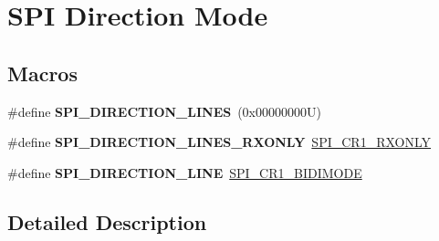 \hypertarget{group___s_p_i___direction}{}\section{S\+PI Direction Mode}
\label{group___s_p_i___direction}
\subsection*{Macros}
\begin{DoxyCompactItemize}
\item 
\mbox{\label{group___s_p_i___direction_gaa7cb7f4bf4eebbf91bcfaeb17ebba7f3}} 
\#define {\bfseries S\+P\+I\+\_\+\+D\+I\+R\+E\+C\+T\+I\+O\+N\+\_\+L\+I\+N\+ES}~(0x00000000\+U)
\item 
\mbox{\label{group___s_p_i___direction_ga444826cf94667f75503f54704b2fb391}} 
\#define {\bfseries S\+P\+I\+\_\+\+D\+I\+R\+E\+C\+T\+I\+O\+N\+\_\+L\+I\+N\+E\+S\+\_\+\+R\+X\+O\+N\+LY}~\mbox{\hyperlink{group___peripheral___registers___bits___definition_ga9ffecf774b84a8cdc11ab1f931791883}{S\+P\+I\+\_\+\+C\+R1\+\_\+\+R\+X\+O\+N\+LY}}
\item 
\mbox{\label{group___s_p_i___direction_gab0f684caf5f1d6ac1e73d90a4778ab93}} 
\#define {\bfseries S\+P\+I\+\_\+\+D\+I\+R\+E\+C\+T\+I\+O\+N\+\_\+L\+I\+NE}~\mbox{\hyperlink{group___peripheral___registers___bits___definition_ga43608d3c2959fc9ca64398d61cbf484e}{S\+P\+I\+\_\+\+C\+R1\+\_\+\+B\+I\+D\+I\+M\+O\+DE}}
\end{DoxyCompactItemize}


\subsection{Detailed Description}

